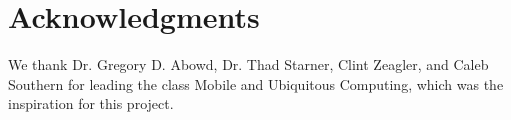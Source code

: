 \documentclass{sigchi}
\newcommand\tabhead[1]{\small\textbf{#1}}
\begin{document}


\section{Acknowledgments}

We thank Dr. Gregory D. Abowd, Dr. Thad Starner, Clint Zeagler, and Caleb Southern for leading the class Mobile and Ubiquitous Computing, which was the inspiration for this project.

%
%
%
%
%
\balance

%
%
\end{document}
